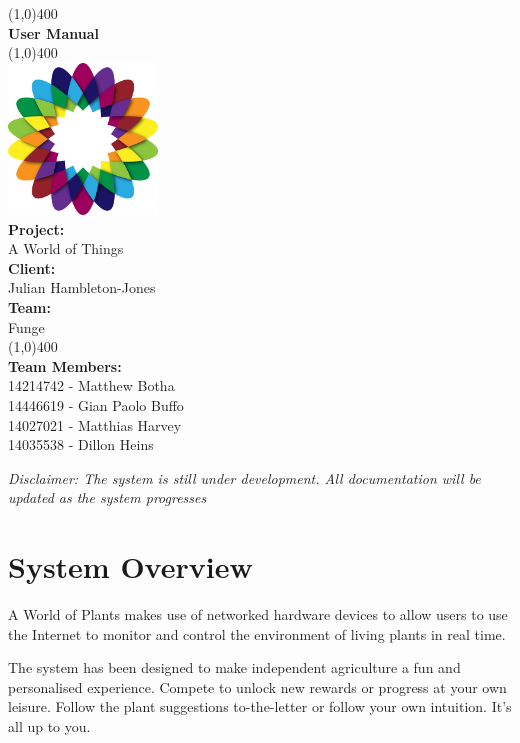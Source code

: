 \documentclass{article}
\begin{document}
\begin{titlepage}
	\begin{center}
		\line(1,0){400}\\
		[6mm]
		\huge{\bfseries User Manual}\\
		\line(1,0){400}\\
		[5mm]
		\includegraphics[width=150px]{../images/AWorldOfPlants.png}
		\\
		[5mm]
		\large\textbf{Project:}\\A World of Things\\
		[3mm]
		\large\textbf{Client:}\\Julian Hambleton-Jones\\
		[3mm]
		\large \textbf{Team:}\\Funge\\
		\line(1,0){400}\\
		[5mm]
		\large \textbf{Team Members:}\\
		[3mm]
		\large 14214742 - Matthew Botha\\
		\large 14446619 - Gian Paolo Buffo\\
		\large 14027021 - Matthias Harvey\\
        \large 14035538 - Dillon Heins\\[3mm]
	\end{center}
\end{titlepage}

\cleardoublepage
\thispagestyle{empty}
\tableofcontents

\cleardoublepage
\setcounter{page}{1}

\textit{Disclaimer: The system is still under development. All documentation will be updated as the system progresses}

\section{System Overview}
	A World of Plants makes use of networked hardware devices to allow users to use the Internet to monitor and control the environment of living plants in real time.
	
	The system has been designed to make independent agriculture a fun and personalised experience. Compete to unlock new rewards or progress at your own leisure. Follow the plant suggestions to-the-letter or follow your own intuition. It's all up to you.
	
\end{document}
